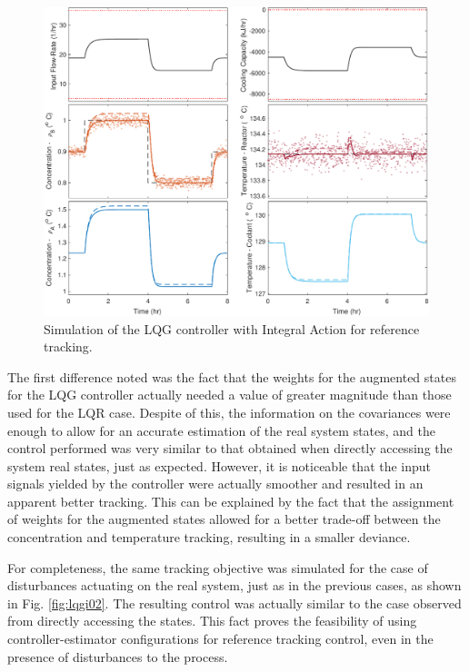 \documentclass[a4paper,11pt]{book}
\numberwithin{figure}{chapter}
\numberwithin{equation}{chapter}
\numberwithin{table}{chapter}
\theoremstyle{definition}
\begin{document}
\begin{figure}[ht] \centering
	\includegraphics[width=\textwidth]{chapter7/lqgi01}
	\caption{Simulation of the LQG controller with Integral Action for reference tracking.}
	\label{fig:lqgi01}
\end{figure}

The first difference noted was the fact that the weights for the augmented states for the LQG controller actually needed a value of greater magnitude than those used for the LQR case. Despite of this, the information on the covariances were enough to allow for an accurate estimation of the real system states, and the control performed was very similar to that obtained when directly accessing the system real states, just as expected. However, it is noticeable that the input signals yielded by the controller were actually smoother and resulted in an apparent better tracking. This can be explained by the fact that the assignment of weights for the augmented states allowed for a better trade-off between the concentration and temperature tracking, resulting in a smaller deviance.

For completeness, the same tracking objective was simulated for the case of disturbances actuating on the real system, just as in the previous cases, as shown in Fig. \ref{fig:lqgi02}. The resulting control was actually similar to the case observed from directly accessing the states. This fact proves the feasibility of using controller-estimator configurations for reference tracking control, even in the presence of disturbances to the process. 
\end{document}
